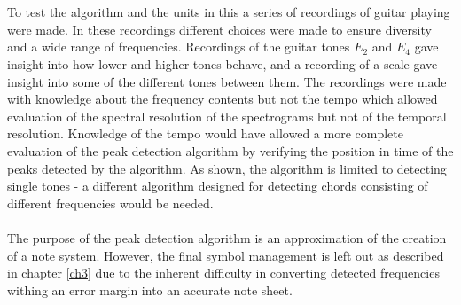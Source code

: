 \\\\
To test the algorithm and the units in this a series of recordings of guitar playing were made. In these recordings different choices were made to ensure diversity and a wide range of frequencies. Recordings of the guitar tones $E_2$ and $E_4$ gave insight into how lower and higher tones behave, and a recording of a scale gave insight into some of the different tones between them. The recordings were made with knowledge about the frequency contents but not the tempo which allowed evaluation of the spectral resolution of the spectrograms but not of the temporal resolution. Knowledge of the tempo would have allowed a more complete evaluation of the peak detection algorithm by verifying the position in time of the peaks detected by the algorithm. As shown, the algorithm is limited to detecting single tones - a different algorithm designed for detecting chords consisting of different frequencies would be needed.
\\\\
The purpose of the peak detection algorithm is an approximation of the creation of a note system. However, the final symbol management is left out as described in chapter \ref{ch3} due to the inherent difficulty in converting detected frequencies withing an error margin into an accurate note sheet.